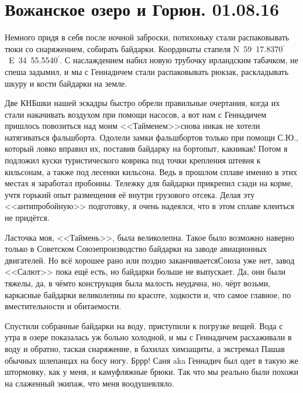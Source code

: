 \chapter{Вожанское озеро и Горюн. 01.08.16} 

Немного придя в себя после ночной заброски, потихоньку стали распаковывать тюки со снаряжением, собирать байдарки. Координаты стапеля N~59\degree~17.8370$^\prime$~E~34\degree~55.5540$^\prime$. С наслаждением  набил новую трубочку ирландским табачком, не спеша задымил, и мы с Геннадичем стали распаковывать рюкзак, раскладывать шкуру и кости байдарки на земле. 

Две КНБ\sdash шки нашей эскадры быстро обрели правильные очертания, когда их стали накачивать воздухом при помощи насосов, а вот нам с Геннадичем пришлось повозиться над моим <<Тайменем>>\mdash снова никак не хотели натягиваться фальшборта. Одолели замки фальшбортов только при помощи С.Ю., который ловко вправил их, поставив байдарку на борт\mdash опыт, как\sdash никак! Потом я подложил куски туристического коврика под точки крепления штевня к кильсонам, а также под лесенки кильсона. Ведь в прошлом сплаве именно в этих местах я заработал пробоины. Тележку для байдарки прикрепил сзади на корме, учтя горький опыт размещения её внутри грузового отсека. Делая эту <<антипробойную>> подготовку, я очень надеялся, что в этом сплаве клеиться не придётся. 

Ласточка моя, <<Таймень>>, была великолепна. Такое было возможно наверно только в Советском Союзе\mdash производство байдарки на заводе авиационных двигателей. Но всё хорошее рано или поздно заканчивается\mdash Союза уже нет, завод <<Салют>> пока ещё есть, но байдарки больше не выпускает. Да, они были тяжелы, да, в чём\sdash то конструкция была малость неудачна, но, чёрт возьми, каркасные байдарки великолепны по красоте, ходкости и, что самое главное, по вместительности и обитаемости.

Спустили собранные байдарки на воду, приступили к погрузке вещей. Вода с утра в озере показалась уж больно холодной, и мы с Геннадичем расхаживали в воду и обратно, таская снаряжение, в бахилах химзащиты, а экстремал Паша\mdash в обычных шлепанцах на босу ногу. Бр\sdash р\sdash р! Саня aka Геннадич был одет в такую же штормовку, как у меня, и камуфляжные брюки. Так что мы реально были похожи на слаженный экипаж, что меня воодушевляло. 

